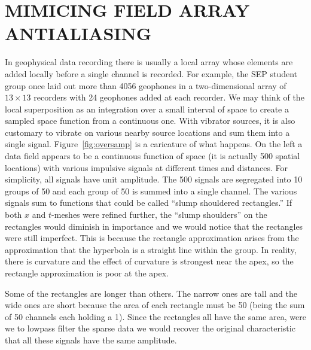 \section{MIMICING FIELD ARRAY ANTIALIASING}
In geophysical data recording there is usually
a local array whose elements are added locally
before a single channel is recorded.
For example, the SEP student group once laid out more than 4056 geophones
in a two-dimensional array of $13\times 13$ recorders
with 24 geophones added at each recorder.
We may think of the local superposition
as an integration over a small interval of space
to create a sampled space function from a continuous one.
With vibrator sources, it is also customary to vibrate on
various nearby source locations and sum them into a single signal.
Figure~\ref{fig:oversamp} is a caricature of what happens.
On the left a data field appears
to be a continuous function of space
(it is actually 500 spatial locations)
with various impulsive signals at different times and distances. %
For simplicity, all signals have unit amplitude.
The 500 signals are segregated into 10 groups of 50
and each group of 50 is summed into a single channel.
The various signals sum to functions
that could be called ``slump shouldered rectangles.''
If both $x$ and $t$-meshes were refined further,
the ``slump shoulders'' on the rectangles would diminish
in importance and we would notice that the rectangles were still imperfect.
This is because the rectangle approximation
arises from the approximation that
the hyperbola is a straight line within the group.
In reality, there is curvature
and the effect of curvature is strongest near the apex,
so the rectangle approximation is poor at the apex.

\par
Some of the rectangles are longer than others.
The narrow ones are tall and the wide ones are short
because the area of each rectangle must be 50
(being the sum of 50 channels each holding a 1).
Since the rectangles all have the same area,
were we to lowpass filter the sparse data
we would recover the original characteristic
that all these signals have the same amplitude.


